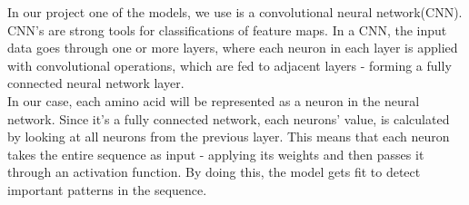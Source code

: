 In our project one of the models, we use is a convolutional neural network(CNN). CNN's are strong tools for classifications of feature maps. In a CNN, the input data goes through one or more layers, where each neuron in each layer is applied with convolutional operations, which are fed to adjacent layers - forming a fully connected neural network layer. \\

\noindent
In our case, each amino acid will be represented as a neuron in the neural network. Since it's a fully connected network, each neurons' value, is calculated by looking at all neurons from the previous layer. This means that each neuron takes the entire sequence as input - applying its weights and then passes it through an activation function. By doing this, the model gets fit to detect important patterns in the sequence.


